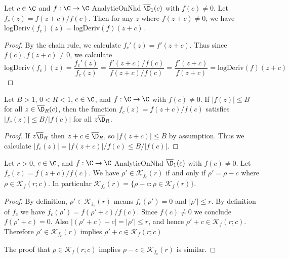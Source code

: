 \begin{lemma} \label{lem:fc_log_deriv}  \leanok
Let $c\in\C$ and $f:\C\to\C$ AnalyticOnNhd $\overline{\D}_1(c)$ with $f(c)\neq 0$. Let $f_c(z) = f(z+c)/f(c)$. Then for any $z$ where $f(z+c) \neq 0$, we have $\text{logDeriv}(f_c)(z) = \text{logDeriv}(f)(z+c)$.
\end{lemma}
\begin{proof}
\leanok
By the chain rule, we calculate $f_c'(z) = f'(z+c)$. Thus since $f(c),f(z+c) \neq 0$, we calculate
\[ \text{logDeriv}(f_c)(z) = \frac{f_c'(z)}{f_c(z)} = \frac{f'(z+c)/f(c)}{f(z+c)/f(c)} = \frac{f'(z+c)}{f(z+c)}= \text{logDeriv}(f)(z+c) \]
\end{proof}

\begin{lemma} \label{lem:fc_bound}  \leanok
Let $B>1$, $0<R<1$, $c\in\C$, and $f:\C\to\C$ with $f(c)\neq 0$. If $|f(z)|\le B$ for all $z\in \overline{\D}_R(c)$, then the function $f_c(z) = f(z+c)/f(c)$ satisfies $|f_c(z)| \le B/|f(c)|$ for all $z\overline{\D}_R$.
\end{lemma}
\begin{proof}
\leanok
If $z\overline{\D}_R$ then $z+c\in \overline{\D}_R$, so $|f(z+c)|\le B$ by assumption.
Thus we calculate $|f_c(z)| = |f(z+c)|/f(c) \le B/|f(c)|$.
\end{proof}

\begin{lemma} \label{lem:fc_zeros}  \leanok
Let $r>0$, $c\in\C$, and $f:\C\to\C$ AnalyticOnNhd $\overline{\D}_1(c)$ with $f(c)\neq 0$. Let $f_c(z) = f(z+c)/f(c)$. We have $\rho'\in\mathcal{K}_{f_c}(r)$ if and only if $\rho'=\rho-c$ where $\rho \in \mathcal{K}_f(r;c)$. In particular $\mathcal{K}_{f_c}(r) = \{\rho-c : \rho\in\mathcal{K}_f(r) \}$.
\end{lemma}
\begin{proof}
\leanok
By definition, $\rho' \in \mathcal{K}_{f_c}(r)$ means $f_c(\rho')=0$ and $|\rho'|\le r$. By definition of $f_c$ we have $f_c(\rho')=f(\rho'+c)/f(c)$. Since $f(c)\neq 0$ we conclude $f(\rho'+c)=0$. Also $|(\rho'+c)-c|=|\rho'|\le r$, and hence $\rho'+c \in \mathcal{K}_{f}(r;c)$. Therefore $\rho' \in \mathcal{K}_{f_c}(r)$ implies $\rho'+c \in \mathcal{K}_{f}(r;c)$

The proof that $\rho \in \mathcal{K}_{f}(r;c)$ implies $\rho-c \in \mathcal{K}_{f_c}(r)$ is similar.
\end{proof}

